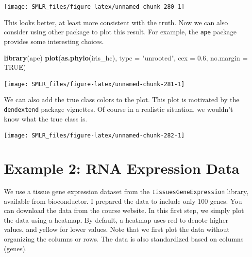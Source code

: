 \documentclass[
]{book}
\newenvironment{Shaded}{\begin{snugshade}}{\end{snugshade}}
\newcommand{\AttributeTok}[1]{\textcolor[rgb]{0.13,0.29,0.53}{#1}}
\newcommand{\ConstantTok}[1]{\textcolor[rgb]{0.56,0.35,0.01}{#1}}
\newcommand{\FloatTok}[1]{\textcolor[rgb]{0.00,0.00,0.81}{#1}}
\newcommand{\FunctionTok}[1]{\textcolor[rgb]{0.13,0.29,0.53}{\textbf{#1}}}
\newcommand{\NormalTok}[1]{#1}
\newcommand{\StringTok}[1]{\textcolor[rgb]{0.31,0.60,0.02}{#1}}
\theoremstyle{definition}
\theoremstyle{definition}
\theoremstyle{definition}
\theoremstyle{definition}
\theoremstyle{remark}
\begin{document}
\begin{center}\texttt{[image: SMLR\_files/figure-latex/unnamed-chunk-280-1]} \end{center}

This looks better, at least more consistent with the truth. Now we can also consider using other package to plot this result. For example, the \texttt{ape} package provides some interesting choices.

\begin{Shaded}
\begin{Highlighting}[]
  \FunctionTok{library}\NormalTok{(ape)}
  \FunctionTok{plot}\NormalTok{(}\FunctionTok{as.phylo}\NormalTok{(iris\_hc), }\AttributeTok{type =} \StringTok{"unrooted"}\NormalTok{, }\AttributeTok{cex =} \FloatTok{0.6}\NormalTok{, }\AttributeTok{no.margin =} \ConstantTok{TRUE}\NormalTok{)}
\end{Highlighting}
\end{Shaded}

\begin{center}\texttt{[image: SMLR\_files/figure-latex/unnamed-chunk-281-1]} \end{center}

We can also add the true class colors to the plot. This plot is motivated by the \texttt{dendextend} package vignettes. Of course in a realistic situation, we wouldn't know what the true class is.

\begin{center}\texttt{[image: SMLR\_files/figure-latex/unnamed-chunk-282-1]} \end{center}

\hypertarget{example-2-rna-expression-data}{%
\section{Example 2: RNA Expression Data}\label{example-2-rna-expression-data}}

We use a tissue gene expression dataset from the \texttt{tissuesGeneExpression} library, available from bioconductor. I prepared the data to include only 100 genes. You can download the data from the course website. In this first step, we simply plot the data using a heatmap. By default, a heatmap uses red to denote higher values, and yellow for lower values. Note that we first plot the data without organizing the columns or rows. The data is also standardized based on columns (genes).
\end{document}
